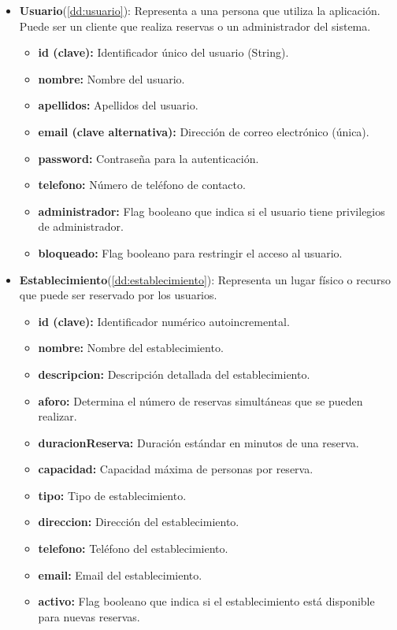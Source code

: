 \begin{itemize}
	\item \textbf{Usuario}(\ref{dd:usuario}): Representa a una persona que utiliza la aplicación. Puede ser un cliente que realiza reservas o un administrador del sistema.
	\begin{itemize}
       \item \textbf{id (clave):} Identificador único del usuario (String).
       \item \textbf{nombre:} Nombre del usuario.
       \item \textbf{apellidos:} Apellidos del usuario.
       \item \textbf{email (clave alternativa):} Dirección de correo electrónico (única).
       \item \textbf{password:} Contraseña para la autenticación.
       \item \textbf{telefono:} Número de teléfono de contacto.
       \item \textbf{administrador:} Flag booleano que indica si el usuario tiene privilegios de administrador.
       \item \textbf{bloqueado:} Flag booleano para restringir el acceso al usuario.
	\end{itemize}
\end{itemize}

\begin{itemize}
	\item \textbf{Establecimiento}(\ref{dd:establecimiento}): Representa un lugar físico o recurso que puede ser reservado por los usuarios.
	\begin{itemize}
       \item \textbf{id (clave):} Identificador numérico autoincremental.
       \item \textbf{nombre:} Nombre del establecimiento.
       \item \textbf{descripcion:} Descripción detallada del establecimiento.
       \item \textbf{aforo:} Determina el número de reservas simultáneas que se pueden realizar.
       \item \textbf{duracionReserva:} Duración estándar en minutos de una reserva.
       \item \textbf{capacidad:} Capacidad máxima de personas por reserva.
       \item \textbf{tipo:} Tipo de establecimiento.
       \item \textbf{direccion:} Dirección del establecimiento.
       \item \textbf{telefono:} Teléfono del establecimiento.
       \item \textbf{email:} Email del establecimiento.
       \item \textbf{activo:} Flag booleano que indica si el establecimiento está disponible para nuevas reservas.
	\end{itemize}
\end{itemize}

